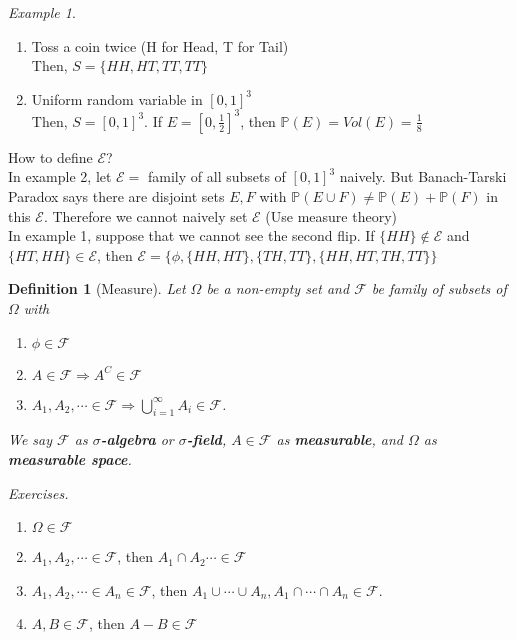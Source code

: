 \documentclass[12pt]{report}
\renewcommand{\1}{\mathbb{1}}
\theoremstyle{break}
\theoremstyle{newdef}
\newtheorem{defn}[thm]{Definition} %
\theoremstyle{remark}
\newtheorem*{exmp}{Example} %
\begin{document}
\begin{exmp}
\begin{minipage}[t]{\linegoal}
\begin{enumerate}
\item Toss a coin twice (H for Head, T for Tail)\\
Then, $S = \{HH, HT, TT, TT\}$
\item Uniform random variable in $[0,1]^3$\\
Then, $S = [0,1]^3$.
If $E = [0,\frac{1}{2}]^3$, then $\mathbb{P}(E) = Vol(E) = \frac{1}{8}$\\
\end{enumerate}
\end{minipage}

How to define $\mathcal{E}$?\\
In example 2, let $\mathcal{E} = $ family of all subsets of $[0,1]^3$ naively.
But Banach-Tarski Paradox says there are disjoint sets $E,F$ with $\mathbb{P}(E\cup F) \neq \mathbb{P}(E) + \mathbb{P}(F)$ in this $\mathcal{E}$.
Therefore we cannot naively set $\mathcal{E}$ (Use measure theory)\\

In example 1, suppose that we cannot see the second flip.
If $\{HH\} \not\in \mathcal{E}$ and $\{HT, HH\}\in\mathcal{E}$, then $\mathcal{E} = \{\phi, \{HH,HT\}, \{TH,TT\}, \{HH,HT,TH,TT\}\}$
\end{exmp}


\begin{defn}[Measure]
Let $\Omega$ be a non-empty set and $\mathcal{F}$ be family of subsets of $\Omega$ with
\begin{enumerate}
\item $\phi \in \mathcal{F}$
\item $A \in \mathcal{F} \Rightarrow A^C \in \mathcal{F}$
\item $A_1, A_2, \cdots \in \mathcal{F} \Rightarrow \bigcup_{i=1}^\infty A_i \in \mathcal{F}$.
\end{enumerate}
We say $\mathcal{F}$ as \textbf{$\sigma$-algebra} or \textbf{$\sigma$-field}, $A \in \mathcal{F}$ as \textbf{measurable}, and $\Omega$ as \textbf{measurable space}.
\end{defn}


\textit{Exercises.}
\leavevmode
\begin{enumerate}[label = \arabic*)]
\item $\Omega \in \mathcal{F}$
\item $A_1, A_2, \cdots \in \mathcal{F}$, then $A_1\cap A_2 \cdots \in \mathcal{F}$
\item $A_1, A_2, \cdots \in A_n \in \mathcal{F}$, then $A_1 \cup \cdots \cup A_n, A_1 \cap \cdots \cap A_n \in \mathcal{F}$.
\item $A, B \in \mathcal{F}$, then $A-B \in \mathcal{F}$
\end{enumerate}
\end{document}

